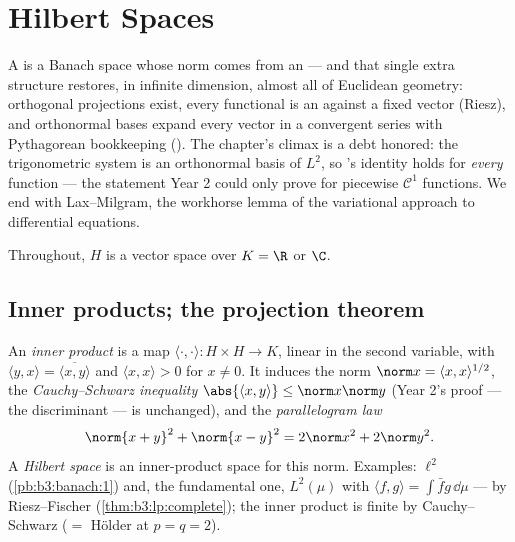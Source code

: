 \chapter{Hilbert Spaces}\label{ch:b3:hilbert}

A  is a Banach space whose norm comes from an
 --- and that single extra structure restores, in
infinite dimension, almost all of Euclidean geometry:
orthogonal projections exist, every  functional is an
 against a fixed vector (Riesz), and orthonormal
bases expand every vector in a convergent series with
Pythagorean bookkeeping (). The chapter's climax is a
debt honored: the trigonometric system is an orthonormal basis
of $L^2$, so 's identity holds for \emph{every}
 function --- the statement Year 2 could only
prove for piecewise $\mathcal C^1$ functions. We end with
Lax--Milgram, the workhorse lemma of the variational approach
to differential equations.

Throughout, $H$ is a vector space over $K = \R$ or $\C$.

\section{Inner products; the projection theorem}

\begin{definition}\label{def:b3:hilbert:inner}
An \emph{inner product} is a map $\langle
\cdot,\cdot\rangle \colon H\times H \to K$, linear in the
second variable, with $\langle y, x\rangle =
\overline{\langle x, y\rangle}$ and $\langle x, x\rangle > 0$
for $x \neq 0$. It induces the norm $\norm x = \langle x,
x\rangle^{1/2}$, the \emph{Cauchy--Schwarz inequality}
$\abs{\langle x, y\rangle} \leq \norm x\norm y$ (Year 2's
proof --- the discriminant --- is unchanged), and the
\emph{parallelogram law}
\[
\norm{x + y}^2 + \norm{x - y}^2 = 2\norm x^2 + 2\norm y^2 .
\]
A \emph{Hilbert space} is an
inner-product space  for this norm. Examples: $\ell^2$
(\cref{pb:b3:banach:1}) and, the fundamental one, $L^2(\mu)$
with $\langle f, g\rangle = \int\bar fg\,\dd\mu$ ---
 by Riesz--Fischer (\cref{thm:b3:lp:complete}); the
inner product is finite by Cauchy--Schwarz ($= $ H\"older at
$p = q = 2$).
\end{definition}

